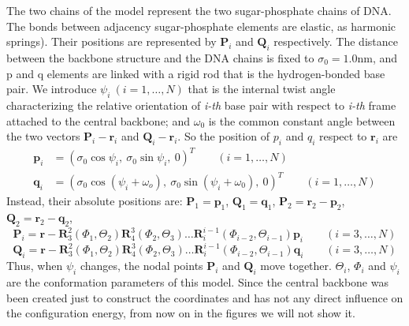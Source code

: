 \documentclass[a4paper,10pt]{article}
\begin{document}
The two chains of the model represent the two sugar-phosphate chains of DNA.
The bonds between adjacency sugar-phosphate elements are elastic, as harmonic springs).
Their positions are represented by $\textbf{P}_i$ and $\textbf{Q}_i$ respectively.
The distance between the backbone structure and the DNA chains is fixed to $\sigma_0=1.0$\si{\nm}, and p and q elements are linked with a rigid rod that is the hydrogen-bonded base pair.
We introduce $\psi_i\ (i=1,\dots,N)$ that is the internal twist angle characterizing the relative orientation of \textit{i-th} base pair with respect to \textit{i-th} frame attached to the central backbone;
and $\omega_0$ is the common constant angle between the two vectors $\textbf{P}_i-\textbf{r}_i$ and $\textbf{Q}_i-\textbf{r}_i$.
So the position of $p_i$ and $q_i$ respect to $\textbf{r}_i$ are
\begin{equation}
\begin{split}
\textbf{p}_i & =\left(\sigma_0\cos\psi_i,\ \sigma_0\sin\psi_i,\ 0\right)^T \qquad (i=1,\dots,N) \\
\textbf{q}_i & =\left(\sigma_0\cos\left(\psi_i+\omega_o\right),\ \sigma_0\sin\left(\psi_i+\omega_0\right),\ 0\right)^T \qquad (i=1,\dots,N)
\end{split}
\end{equation}
Instead, their absolute positions are: $\textbf{P}_1=\textbf{p}_1$, $\textbf{Q}_1=\textbf{q}_1$, $\textbf{P}_2=\textbf{r}_2-\textbf{p}_2$, $\textbf{Q}_2=\textbf{r}_2-\textbf{q}_2$,
\begin{equation}
\textbf{P}_i=\textbf{r}-\textbf{R}^{2}_{3}\left(\Phi_1,\Theta_2\right)\textbf{R}^{3}_{4}\left(\Phi_2,\Theta_3\right)\dots\textbf{R}^{i-1}_{i}\left(\Phi_{i-2},\Theta_{i-1}\right)\textbf{p}_i\qquad (i=3,\dots,N)
\end{equation}
\begin{equation}
\textbf{Q}_i=\textbf{r}-\textbf{R}^{2}_{3}\left(\Phi_1,\Theta_2\right)\textbf{R}^{3}_{4}\left(\Phi_2,\Theta_3\right)\dots\textbf{R}^{i-1}_{i}\left(\Phi_{i-2},\Theta_{i-1}\right)\textbf{q}_i\qquad (i=3,\dots,N)
\end{equation}
Thus, when $\psi_i$ changes, the nodal points $\textbf{P}_i$ and $\textbf{Q}_i$ move together.
$\Theta_i$, $\Phi_i$ and $\psi_i$ are the conformation parameters of this model.
Since the central backbone was been created just to construct the coordinates and has not any direct influence on the configuration energy, from now on in the figures we will not show it.
\end{document}
